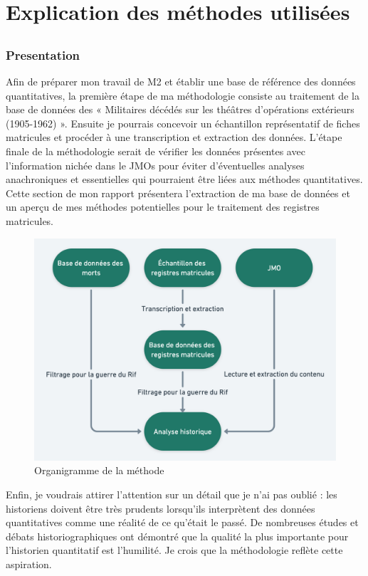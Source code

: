 \part{Explication des méthodes utilisées}
\chapter{}
\section{Presentation}
Afin de préparer mon travail de M2 et établir une base de référence des données quantitatives, la première étape de ma méthodologie consiste au traitement de la base de données des « Militaires décédés sur les théâtres d'opérations extérieurs (1905-1962) ».  Ensuite je pourrais concevoir un échantillon représentatif de fiches matricules et procéder à une transcription et extraction des données. L’étape finale de la méthodologie serait de vérifier les données présentes avec l’information nichée dans le JMOs pour éviter d'éventuelles analyses anachroniques et essentielles qui pourraient être liées aux méthodes quantitatives. Cette section de mon rapport présentera l'extraction de ma base de données et un aperçu de mes méthodes potentielles pour le traitement des registres matricules. 
\begin{figure}[H]
    \centering
    \includegraphics[scale=0.25]{Images/pipeline.png}
    \caption{Organigramme de la méthode}
    \label{fig:Pipeline}
\end{figure}
Enfin, je voudrais attirer l'attention sur un détail que je n'ai pas oublié : les historiens doivent être très prudents lorsqu'ils interprètent des données quantitatives comme une réalité de ce qu'était le passé. De nombreuses études et débats historiographiques ont démontré que la qualité la plus importante pour l'historien quantitatif est l'humilité. Je crois que la méthodologie reflète cette aspiration.

